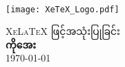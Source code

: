 \begin{titlepage}

\begin{center}
{\LARGE  \bfseries \titleSentence}\\[1cm]

\texttt{[image: XeTeX\_Logo.pdf]}\\[5cm]   
 
\vfill

\textsc{\large XeLaTeX ဖြင့်အသုံးပြုခြင်း}\\[1cm]



{\Large \bfseries ကိုအေး}\\[1cm]

{\large \mydate\today}

\end{center}
\end{titlepage}